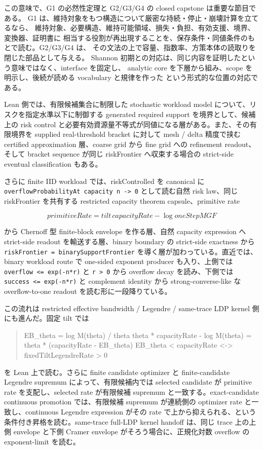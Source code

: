 \documentclass[12pt,a4paper]{article}
\begin{document}
この意味で、G1 の必然性定理と G2/G3/G4 の closed capstone は重要な節目である。 G1 は、維持対象をもつ構造について厳密な持続・停止・崩壊計算を立てるなら、 維持対象、必要構造、維持可能領域、損失・負担、有効支援、境界、変換器、証明書に 相当する役割が再出現することを、保存条件・同値条件のもとで読む。G2/G3/G4 は、 その文法の上で容量、指数率、方策本体の読取りを閉じた部品として与える。 Shannon 初期との対応は、同じ内容を証明したという意味ではなく、interface を固定し、 analytic core を下層から組み、scope を明示し、後続が読める vocabulary と規律を作った という形式的な位置の対応である。

Lean 側では、有限候補集合に制限した stochastic workload model について、リスクを指定水準以下に制御する generated required support を境界として、候補上の risk control と必要有効資源量不等式が同値になる層がある。また、その有限境界を supplied real-threshold bracket に対して mesh / delta 精度で挟む certified approximation 層、coarse grid から fine grid への refinement readout、そして bracket sequence が同じ riskFrontier へ収束する場合の strict-side eventual classification もある。

さらに finite IID workload では、riskControlled を canonical に \texttt{overflowProbabilityAt\ capacity\ n\ -\textgreater{}\ 0} として読む自然 risk law、同じ riskFrontier を共有する restricted capacity theorem capsule、primitive rate

\[
primitiveRate = tilt \, capacityRate - \log oneStepMGF
\]

から Chernoff 型 finite-block envelope を作る層、自然 capacity expression へ strict-side readout を輸送する層、binary boundary の strict-side exactness から \texttt{riskFrontier\ =\ binarySupportFrontier} を導く層が加わっている。直近では、binary workload route で one-sided exponent producer も入り、上側では \texttt{overflow\ \textless{}=\ exp(-n*r)} と \texttt{r\ \textgreater{}\ 0} から overflow decay を読み、下側では \texttt{success\ \textless{}=\ exp(-n*r)} と complement identity から strong-converse-like な overflow-to-one readout を読む形に一段降りている。

この流れは restricted effective bandwidth / Legendre / same-trace LDP kernel 側にも進んだ。固定 tilt では

\begin{quote}
\small
EB\_theta = log M(theta) / theta theta * capacityRate - log M(theta) = theta * (capacityRate - EB\_theta) EB\_theta < capacityRate <-> fixedTiltLegendreRate > 0
\end{quote}

を Lean 上で読む。さらに finite candidate optimizer と finite-candidate Legendre supremum によって、有限候補内では selected candidate が primitive rate を支配し、selected rate が有限候補 supremum と一致する。exact-candidate continuous promotion では、有限候補 supremum が連続側の optimizer rate と一致し、continuous Legendre expression がその rate で上から抑えられる、という条件付き昇格を読む。same-trace full-LDP kernel handoff は、同じ trace 上の上側 envelope と下側 Cramer envelope がそろう場合に、正規化対数 overflow の exponent-limit を読む。
\end{document}
